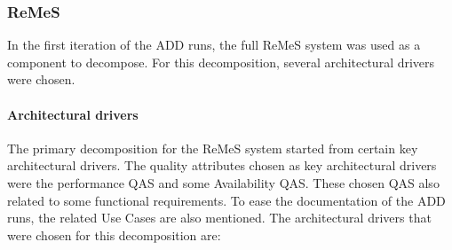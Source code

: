 \subsubsection{ReMeS}
In the first iteration of the ADD runs, the full ReMeS system was used as a component to decompose. 
For this decomposition, several architectural drivers were chosen.


\paragraph{Architectural drivers}
The primary decomposition for the ReMeS system started from certain 
key architectural drivers. The quality attributes chosen as key architectural drivers were the performance QAS and some Availability QAS.
These chosen QAS also related to some functional requirements. To ease the documentation of the ADD runs, the related Use Cases are also mentioned.
The architectural drivers that were chosen for this decomposition are:
